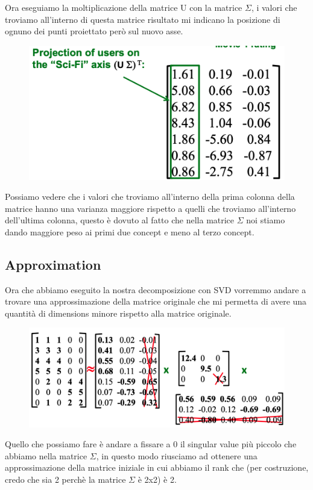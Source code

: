 \documentclass[14pt]{extreport}
\begin{document}
Ora eseguiamo la moltiplicazione della matrice U con la matrice $\Sigma$, i valori che troviamo all'interno di questa matrice risultato mi indicano la posizione 
di ognuno dei punti proiettato però sul nuovo asse.


\begin{figure}[H] 
	\centering
	\includegraphics[width=0.7\linewidth]{505.jpeg}
	\end{figure}


Possiamo vedere che i valori che troviamo all'interno della prima colonna della matrice hanno una varianza maggiore rispetto a quelli che troviamo all'interno dell'ultima
colonna, questo è dovuto al fatto che nella matrice $\Sigma$ noi stiamo dando maggiore peso ai primi due concept e meno al terzo concept.

\subsection{Approximation}

Ora che abbiamo eseguito la nostra decomposizione con SVD vorremmo andare a trovare una approssimazione della matrice originale che mi permetta di avere una 
quantità di dimensions minore rispetto alla matrice originale.

\begin{figure}[H] 
\centering
\includegraphics[width=0.7\linewidth]{506.jpeg}
\end{figure}

Quello che possiamo fare è andare a fissare a 0 il singular value più piccolo che abbiamo nella matrice $\Sigma$, in questo modo riusciamo ad ottenere 
una approssimazione della matrice iniziale in cui abbiamo il rank che (per costruzione, credo che sia 2 perchè la matrice $\Sigma$ è 2x2) è 2.
\end{document}
